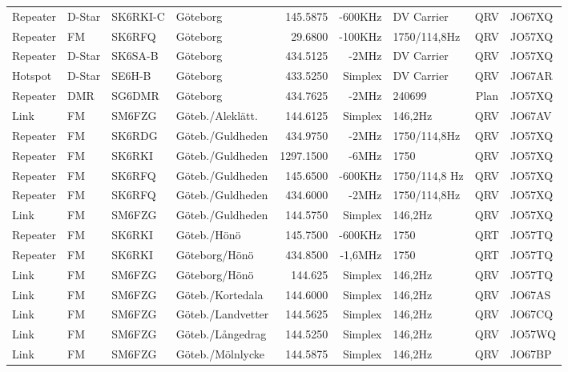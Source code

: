 \begin{landscape}
\begin{longtable}{llllrrlcl}
Repeater & D-Star & SK6RKI-C & Göteborg            & 145.5875  & -600KHz & DV Carrier      & QRV  & JO67XQ \\
Repeater & FM     & SK6RFQ   & Göteborg            & 29.6800   & -100KHz & 1750/114,8Hz    & QRV  & JO57XQ \\
Repeater & D-Star & SK6SA-B  & Göteborg            & 434.5125  & -2MHz   & DV Carrier      & QRV  & JO57XQ \\
Hotspot  & D-Star & SE6H-B   & Göteborg            & 433.5250  & Simplex & DV Carrier      & QRV  & JO67AR \\
Repeater & DMR    & SG6DMR   & Göteborg            & 434.7625  & -2MHz   & 240699          & Plan & JO57XQ \\
Link     & FM     & SM6FZG   & Göteb./Aleklätt.    & 144.6125  & Simplex & 146,2Hz         & QRV  & JO67AV \\
Repeater & FM     & SK6RDG   & Göteb./Guldheden    & 434.9750  & -2MHz   & 1750/114,8Hz    & QRV  & JO57XQ \\
Repeater & FM     & SK6RKI   & Göteb./Guldheden    & 1297.1500 & -6MHz   & 1750            & QRV  & JO57XQ \\
Repeater & FM     & SK6RFQ   & Göteb./Guldheden    & 145.6500  & -600KHz & 1750/114,8 Hz   & QRV  & JO57XQ \\
Repeater & FM     & SK6RFQ   & Göteb./Guldheden    & 434.6000  & -2MHz   & 1750/114,8Hz    & QRV  & JO57XQ \\
Link     & FM     & SM6FZG   & Göteb./Guldheden    & 144.5750  & Simplex & 146,2Hz         & QRV  & JO57XQ \\
Repeater & FM     & SK6RKI   & Göteb./Hönö         & 145.7500  & -600KHz & 1750            & QRT  & JO57TQ \\
Repeater & FM     & SK6RKI   & Göteborg/Hönö       & 434.8500  & -1,6MHz & 1750            & QRT  & JO57TQ \\
Link     & FM     & SM6FZG   & Göteborg/Hönö       & 144.625   & Simplex & 146,2Hz         & QRV  & JO57TQ \\
Link     & FM     & SM6FZG   & Göteb./Kortedala    & 144.6000  & Simplex & 146,2Hz         & QRV  & JO67AS \\
Link     & FM     & SM6FZG   & Göteb./Landvetter   & 144.5625  & Simplex & 146,2Hz         & QRV  & JO67CQ \\
Link     & FM     & SM6FZG   & Göteb./Långedrag    & 144.5250  & Simplex & 146,2Hz         & QRV  & JO57WQ \\
Link     & FM     & SM6FZG   & Göteb./Mölnlycke    & 144.5875  & Simplex & 146,2Hz         & QRV  & JO67BP \\

\end{longtable}
\end{landscape}

